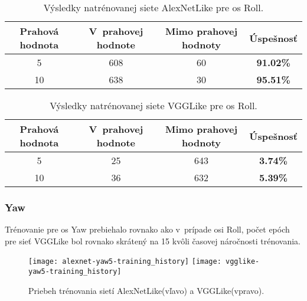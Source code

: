 \begin{table}[H]
    \centering
    \begin{tabular}{|c|c|c|c|}
        \hline
        Prahová hodnota & V~prahovej hodnote       & Mimo prahovej hodnoty    & Úspešnosť    \\ \hline
        5               & {\color[HTML]{009901} 608} & {\color[HTML]{9A0000} 60} & \textbf{91.02\%} \\ \hline
        10              & {\color[HTML]{009901} 638} & {\color[HTML]{9A0000} 30} & \textbf{95.51\%} \\ \hline
    \end{tabular}
    \caption{Výsledky natrénovanej siete AlexNetLike pre os Roll.}
    \label{tab:alexnetrollresults}
\end{table}
\begin{table}[H]
    \centering
    \begin{tabular}{|c|c|c|c|}
        \hline
        Prahová hodnota & V~prahovej hodnote       & Mimo prahovej hodnoty    & Úspešnosť    \\ \hline
        5               & {\color[HTML]{009901} 25} & {\color[HTML]{9A0000} 643} & \textbf{3.74\%} \\ \hline
        10              & {\color[HTML]{009901} 36} & {\color[HTML]{9A0000} 632} & \textbf{5.39\%} \\ \hline
    \end{tabular}
    \caption{Výsledky natrénovanej siete VGGLike pre os Roll.}
    \label{tab:vgglikerollresults}
\end{table}


\subsubsection{Yaw}
Trénovanie pre os Yaw prebiehalo rovnako ako v~prípade osi Roll, počet epóch pre sieť VGGLike
    bol rovnako skrátený na 15 kvôli časovej náročnosti trénovania.

\begin{figure}[H]
    \centering
    \texttt{[image: alexnet-yaw5-training\_history]}
	\texttt{[image: vgglike-yaw5-training\_history]}
	\caption{Priebeh trénovania sietí AlexNetLike(vľavo) a VGGLike(vpravo).}
	\label{pic:yawaxis}
\end{figure}

